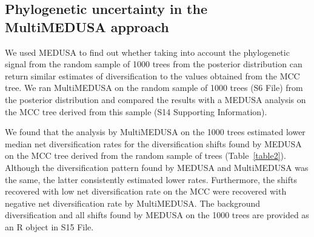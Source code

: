 \documentclass[10pt,letterpaper]{article}
\begin{document}
\subsection*{Phylogenetic uncertainty in the MultiMEDUSA
approach}

We used MEDUSA to find out whether taking into account the phylogenetic
signal from the random sample of 1000 trees from the posterior
distribution can return similar estimates of diversification to the
values obtained from the MCC tree. We ran MultiMEDUSA on the random
sample of 1000 trees (S6 File) from the posterior distribution and
compared the results with a MEDUSA analysis on the MCC tree derived from
this sample (S14 Supporting Information).

We found that the analysis by MultiMEDUSA on the 1000 trees estimated
lower median net diversification rates for the diversification shifts
found by MEDUSA on the MCC tree derived from the random sample of trees
(Table~\ref{table2}). Although the diversification pattern found by MEDUSA and
MultiMEDUSA was the same, the latter consistently estimated lower rates.
Furthermore, the shifts recovered with low net diversification rate on
the MCC were recovered with negative net diversification rate by
MultiMEDUSA. The background diversification and all shifts found by
MEDUSA on the 1000 trees are provided as an R object in S15 File.
\end{document}
